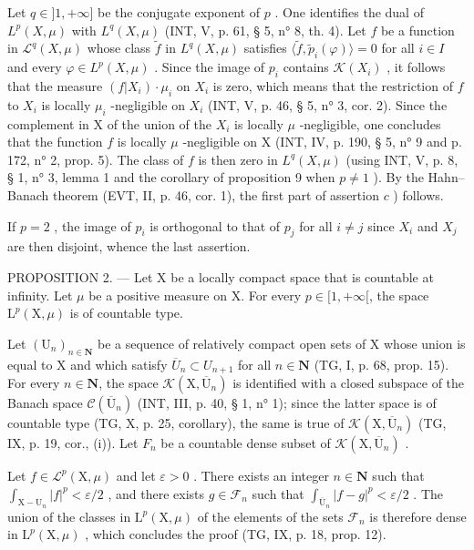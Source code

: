 Let \(q \in ]1, +\infty]\) be the conjugate exponent of \(p\) . One identifies the dual of \(L^p(X, \mu)\) with \(L^q(X, \mu)\) (INT, V, p. 61, § 5, n° 8, th. 4). Let \(f\) be a function in \(\mathcal{L}^q(X, \mu)\) whose class \(\widetilde{f}\) in \(L^q(X, \mu)\) satisfies \(\langle \widetilde{f}, \widetilde{p}_i(\varphi) \rangle = 0\) for all \(i \in I\) and every \(\varphi \in L^p(X, \mu)\) . Since the image of \(p_i\) contains \(\mathcal{K}(X_i)\) , it follows that the measure \((f|X_i) \cdot \mu_i\) on \(X_i\) is zero, which means that the restriction of \(f\) to \(X_i\) is locally \(\mu_i\) -negligible on \(X_i\) (INT, V, p. 46, § 5, n° 3, cor. 2). Since the complement in X of the union of the \(X_i\) is locally \(\mu\) -negligible, one concludes that the function \(f\) is locally \(\mu\) -negligible on X (INT, IV, p. 190, § 5, n° 9 and p. 172, n° 2, prop. 5). The class of \(f\) is then zero in \(L^q(X, \mu)\) (using INT, V, p. 8, § 1, n° 3, lemma 1 and the corollary of proposition 9 when \(p \neq 1\) ). By the Hahn--Banach theorem (EVT, II, p. 46, cor. 1), the first part of assertion \(c\) ) follows.

If \(p = 2\) , the image of \(p_i\) is orthogonal to that of \(p_j\) for all \(i \neq j\) since \(X_i\) and \(X_j\) are then disjoint, whence the last assertion.

PROPOSITION 2. --- Let X be a locally compact space that is countable at infinity. Let \(\mu\) be a positive measure on X. For every \(p \in [1, +\infty[\), the space \(\mathrm{L}^{p}(\mathrm{X},\mu)\) is of countable type.

Let \((\mathrm{U}_{n})_{n\in\mathbf{N}}\) be a sequence of relatively compact open sets of X whose union is equal to X and which satisfy \(\overline{U}_{n}\subset U_{n+1}\) for all \(n\in\mathbf{N}\) (TG, I, p. 68, prop. 15). For every \(n\in\mathbf{N}\), the space \(\mathcal{K}(\mathrm{X},\overline{\mathrm{U}}_{n})\) is identified with a closed subspace of the Banach space \(\mathcal{C}(\overline{\mathrm{U}}_{n})\) (INT, III, p. 40, § 1, n° 1); since the latter space is of countable type (TG, X, p. 25, corollary), the same is true of \(\mathcal{K}(\mathrm{X},\overline{\mathrm{U}}_{n})\) (TG, IX, p. 19, cor., (i)). Let \(F_{n}\) be a countable dense subset of \(\mathcal{K}(\mathrm{X},\overline{\mathrm{U}}_{n})\) .

Let \(f \in \mathcal{L}^p(\mathrm{X},\mu)\) and let \(\varepsilon > 0\) . There exists an integer \(n \in \mathbf{N}\) such that \(\int_{\mathrm{X}-\mathrm{U}_n}|f|^p < \varepsilon / 2\) , and there exists \(g \in \mathcal{F}_n\) such that \(\int_{\overline{\mathrm{U}}_n}|f - g|^p < \varepsilon / 2\) . The union of the classes in \(\mathrm{L}^p(\mathrm{X},\mu)\) of the elements of the sets \(\mathcal{F}_n\) is therefore dense in \(\mathrm{L}^p(\mathrm{X},\mu)\) , which concludes the proof (TG, IX, p. 18, prop. 12).

